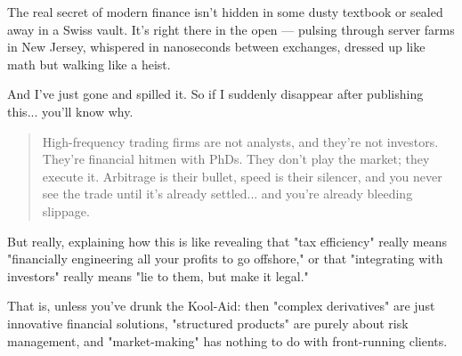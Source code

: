 The real secret of modern finance isn’t hidden in some dusty textbook or sealed away in a Swiss vault. It’s right there in the open — pulsing through server farms in New Jersey, whispered in nanoseconds between exchanges, dressed up like math but walking like a heist.

And I’ve just gone and spilled it.  So if I suddenly disappear after publishing this... you'll know why. 

\begin{quote}
High-frequency trading firms are not analysts, and they’re not investors. They’re financial hitmen with PhDs. They don’t play the market; they execute it. Arbitrage is their bullet, speed is their silencer, and you never see the trade until it’s already settled... and you’re already bleeding slippage.
\end{quote}

But really, explaining how this is like revealing that "tax efficiency" really means "financially engineering all your profits to go offshore," or that "integrating with investors" really means "lie to them, but make it legal."

That is, unless you’ve drunk the Kool-Aid: then "complex derivatives" are just innovative financial solutions, "structured products" are purely about risk management, and "market-making" has nothing to do with front-running clients.

